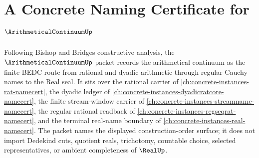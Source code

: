 \chapter{A Concrete Naming Certificate for $\ArithmeticalContinuumUp$}
\label{ch:concrete-instances-arithmetical-continuum-namecert}

Following Bishop and Bridges constructive analysis, the $\ArithmeticalContinuumUp$ packet records the arithmetical continuum as the finite BEDC route from rational and dyadic arithmetic through regular Cauchy names to the Real seal. It sits over the rational carrier of \autoref{ch:concrete-instances-rat-namecert}, the dyadic ledger of \autoref{ch:concrete-instances-dyadicratcore-namecert}, the finite stream-window carrier of \autoref{ch:concrete-instances-streamname-namecert}, the regular rational readback of \autoref{ch:concrete-instances-regseqrat-namecert}, and the terminal real-name boundary of \autoref{ch:concrete-instances-real-namecert}. The packet names the displayed construction-order surface; it does not import Dedekind cuts, quotient reals, trichotomy, countable choice, selected representatives, or ambient completeness of $\RealUp$.

